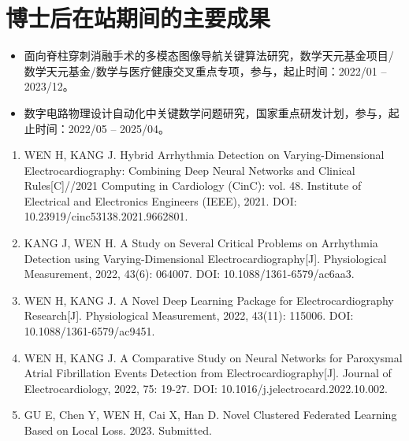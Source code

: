 \chapter*{博士后在站期间的主要成果}
\headheight=15.24pt%


\begin{itemize}
    \item 面向脊柱穿刺消融手术的多模态图像导航关键算法研究，数学天元基金项目/数学天元基金/数学与医疗健康交叉重点专项，参与，起止时间：2022/01 -- 2023/12。
    \item 数字电路物理设计自动化中关键数学问题研究，国家重点研发计划，参与，起止时间：2022/05 -- 2025/04。
\end{itemize}


\begin{enumerate}
    \item WEN H, KANG J. Hybrid Arrhythmia Detection on Varying-Dimensional Electrocardiography: Combining Deep Neural Networks and Clinical Rules[C]//2021 Computing in Cardiology (CinC): vol. 48. Institute of Electrical and Electronics Engineers (IEEE), 2021. DOI: 10.23919/cinc53138.2021.9662801.
    \item KANG J, WEN H. A Study on Several Critical Problems on Arrhythmia Detection using Varying-Dimensional Electrocardiography[J]. Physiological Measurement, 2022, 43(6): 064007. DOI: 10.1088/1361-6579/ac6aa3.
    \item WEN H, KANG J. A Novel Deep Learning Package for Electrocardiography Research[J]. Physiological Measurement, 2022, 43(11): 115006. DOI: 10.1088/1361-6579/ac9451.
    \item WEN H, KANG J. A Comparative Study on Neural Networks for Paroxysmal Atrial Fibrillation Events Detection from Electrocardiography[J]. Journal of Electrocardiology, 2022, 75: 19-27. DOI: 10.1016/j.jelectrocard.2022.10.002.
    \item GU E, Chen Y, WEN H, Cai X, Han D. Novel Clustered Federated Learning Based on Local Loss. 2023. Submitted.
\end{enumerate}



